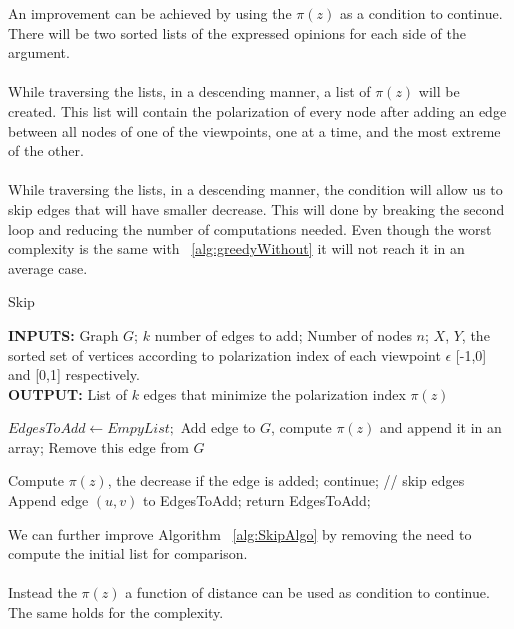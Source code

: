 \clearpage


\noindent An improvement can be achieved by using the $\pi(z)$ as a condition to continue. There will be two sorted lists of the expressed opinions for each side of the argument.
\\
\\
While traversing the lists, in a descending manner, a list of $\pi(z)$ will be created. This list will contain the polarization of every node after adding an edge between all nodes of one of the viewpoints, one at a time, and the most extreme of the other. 
\\
\\
While traversing the lists, in a descending manner, the condition will allow us to skip edges that will have smaller decrease. This will done by breaking the second loop and reducing the number of computations needed. Even though the worst complexity is the same with ~\ref{alg:greedyWithout} it will not reach it in an average case.

\begin{algorithm}[htbp]
	\caption{Skip}
	\label{alg:SkipAlgo}
	\begin{flushleft}
        		\textbf{INPUTS:} Graph $G$; $k$ number of edges to add; Number of nodes $n$;
		$X$, $Y $, the sorted set of vertices according to polarization index of each viewpoint $\epsilon$ [-1,0] and [0,1] respectively.\\
		\vspace{6pt}
        		\textbf{OUTPUT:} List of $k$ edges that minimize the polarization index $\pi(z)$
	\end{flushleft}
	\begin{algorithmic}[1]
		\STATE $EdgesToAdd \leftarrow Empy List;$
		\STATE Add edge to $G$, compute $\pi(z)$ and append it in an array;
		\STATE Remove this edge from $G$
		\ENDFOR
		
		\STATE Compute $\pi(z)$, the decrease if the edge is added;
			\STATE continue; // skip edges
		\ENDIF
		\STATE Append edge $(u,v)$ to EdgesToAdd;
			\STATE return EdgesToAdd;
		\ENDIF
		\ENDFOR
	\end{algorithmic}
\end{algorithm}
\clearpage

\noindent We can further improve  Algorithm ~\ref{alg:SkipAlgo} by removing the need to compute the initial list for comparison. 
\\
\\
Instead the $\pi(z)$ a function of distance can be used as condition to continue. The same holds for the complexity.
\\
\\

